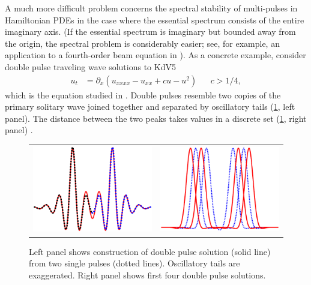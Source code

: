 \documentclass[10pt,reqno]{amsart}
\theoremstyle{plain}
\theoremstyle{definition}
\theoremstyle{remark}
\numberwithin{theorem}{section}
\numberwithin{equation}{section}
\begin{document}
A much more difficult problem concerns the spectral stability of multi-pulses in Hamiltonian PDEs in the case where the essential spectrum consists of the entire imaginary axis. (If the essential spectrum is imaginary but bounded away from the origin, the spectral problem is considerably easier; see, for example, an application to a fourth-order beam equation in \cite[Secton 6]{Kapitula2020}). As a concrete example, consider double pulse traveling wave solutions to KdV5
\begin{align}\label{KdV5example}
u_t &= \partial_x\left( u_{xxxx} - u_{xx} + c u - u^2\right) && c > 1/4,
\end{align}
which is the equation studied in \cite{Pelinovsky2007}. Double pulses resemble two copies of the primary solitary wave joined together and separated by oscillatory tails (\cref{fig:KdV5double}, left panel). The distance between the two peaks takes values in a discrete set (\cref{fig:KdV5double}, right panel) \cite{Pelinovsky2007,SandstedeStrut}. 
\begin{figure}[H]
\begin{center}
\begin{tabular}{cc}
\includegraphics[width=7cm]{images/dpconstruction.eps} &
\includegraphics[width=7cm]{images/doublepulsealt.eps}
\end{tabular}
\end{center}
\caption{Left panel shows construction of double pulse solution (solid line) from two single pulses (dotted lines). Oscillatory tails are exaggerated. Right panel shows first four double pulse solutions.}
\label{fig:KdV5double}
\end{figure} 
\end{document}
